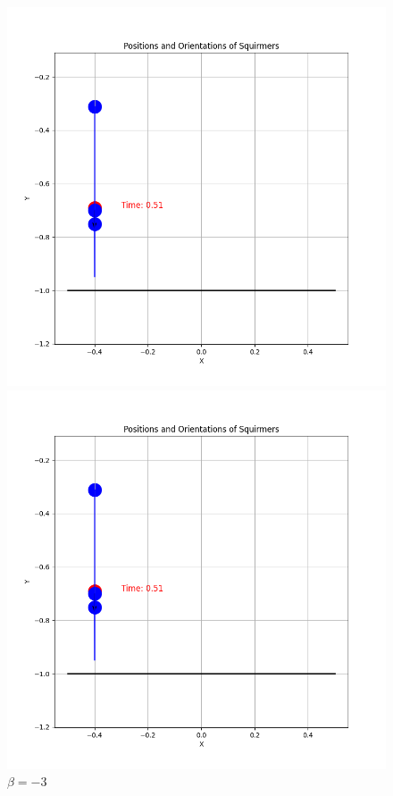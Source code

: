 \documentclass{article}
\begin{document}
\begin{figure}[H]
    \centering
    \begin{minipage}{0.49\textwidth}
        \includegraphics[width=1.1\textwidth]{graphs/simulations/border/betam1_5/mpi_2.png}
        \caption{\footnotesize $\beta = -1.5$}
    \end{minipage}\hfill
    \begin{minipage}{0.49\textwidth}
        \includegraphics[width=1.1\textwidth]{graphs/simulations/border/betam3/mpi_2.png}
        \caption{\footnotesize $\beta = -3$}
    \end{minipage}
\end{figure}
\end{document}
